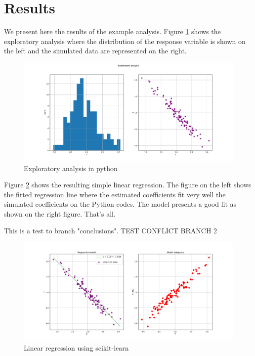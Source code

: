 \section{Results}


We present here the results of the example analysis. Figure \ref{fig:exploratory_analysis} shows the exploratory analysis where the distribution of the response variable is shown on the left and the simulated data are represented on the right.

\begin{figure}
\centering
\includegraphics[width=\textwidth]{figures/fig_exploratory_analysis.pdf}
\caption{Exploratory analysis in python}
\label{fig:exploratory_analysis}
\end{figure}

Figure \ref{fig:linear_regression} shows the resulting simple linear regression. The figure on the left shows the fitted regression line where the estimated coefficients fit very well the simulated coefficients on the Python codes. The model presents a good fit as shown on the right figure. That's all.

This is a test to branch "conclusions". TEST CONFLICT BRANCH 2

\begin{figure}
\centering
\includegraphics[width=\textwidth]{figures/fig_linear_regression.pdf}
\caption{Linear regression using scikit-learn}
\label{fig:linear_regression}
\end{figure}